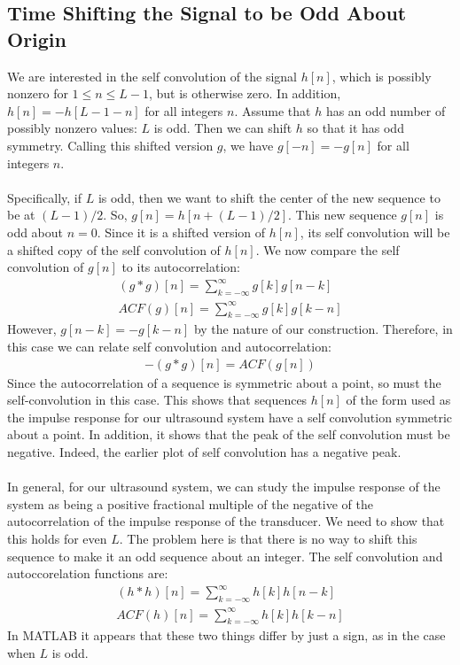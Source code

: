 \subsection*{Time Shifting the Signal to be Odd About Origin}
We are interested in the self convolution of the signal $h[n]$, which is possibly nonzero for $1 \leq n \leq L -1$, but is otherwise zero. In addition, $h[n] = -h[L-1-n]$ for all integers $n$. Assume that $h$ has an odd number of possibly nonzero values: $L$ is odd. Then we can shift $h$ so that it has odd symmetry. Calling this shifted version $g$, we have $g[-n] = -g[n]$ for all integers $n$.
\\\\
Specifically, if $L$ is odd, then we want to shift the center of the new sequence to be at $(L-1)/2$. So, $g[n] = h[n+(L-1)/2]$. This new sequence $g[n]$ is odd about $n = 0$. Since it is  a shifted version of $h[n]$, its self convolution will be a shifted copy of the self convolution of $h[n]$. We now compare the self convolution of $g[n]$ to its autocorrelation:
\begin{align*}
(g*g)[n] = \sum_{k = -\infty}^{\infty} g[k]g[n-k] \\
ACF(g)[n] = \sum_{k = -\infty}^{\infty} g[k]g[k-n] 
\end{align*}
However, $g[n-k] = -g[k-n]$ by the nature of our construction. Therefore, in this case we can relate self convolution and autocorrelation:
\begin{align*}
-(g*g)[n] = ACF(g[n])
\end{align*}
Since the autocorrelation of a sequence is symmetric about a point, so must the self-convolution in this case.  This shows that sequences $h[n]$ of the form used as the impulse response for our ultrasound system have a self convolution symmetric about a point. In addition, it shows that the peak of the self convolution must be negative. Indeed, the earlier plot of self convolution has a negative peak.
\\\\
In general, for our ultrasound system, we can study the impulse response of the system as being a positive fractional multiple of the negative of the autocorrelation of the impulse response of the transducer.
\clearpage
We need to show that this holds for even $L$. The problem here is that there is no way to shift this sequence to make it an odd sequence about an integer. The self convolution and autoccorelation functions are:
\begin{align*}
(h*h)[n] = \sum_{k = -\infty}^{\infty} h[k]h[n-k] \\
ACF(h)[n] = \sum_{k = -\infty}^{\infty} h[k]h[k-n] 
\end{align*}
In MATLAB it appears that these two things differ by just a sign, as in the case when $L$ is odd. 